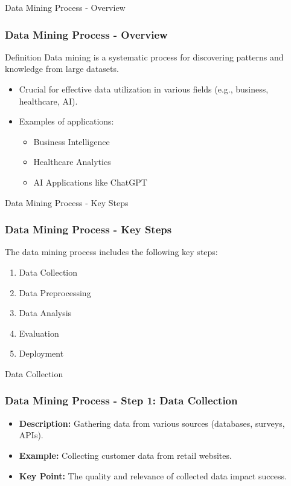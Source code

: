 \documentclass[aspectratio=169]{beamer}
\begin{document}
\begin{frame}[fragile]{Data Mining Process - Overview}
    \frametitle{Data Mining Process - Overview}
    \begin{block}{Definition}
        Data mining is a systematic process for discovering patterns and knowledge from large datasets. 
    \end{block}
    \begin{itemize}
        \item Crucial for effective data utilization in various fields (e.g., business, healthcare, AI).
        \item Examples of applications: 
        \begin{itemize}
            \item Business Intelligence
            \item Healthcare Analytics
            \item AI Applications like ChatGPT
        \end{itemize}
    \end{itemize}
\end{frame}

\begin{frame}[fragile]{Data Mining Process - Key Steps}
    \frametitle{Data Mining Process - Key Steps}
    The data mining process includes the following key steps:
    \begin{enumerate}
        \item Data Collection
        \item Data Preprocessing
        \item Data Analysis
        \item Evaluation
        \item Deployment
    \end{enumerate}
\end{frame}

\begin{frame}[fragile]{Data Collection}
    \frametitle{Data Mining Process - Step 1: Data Collection}
    \begin{itemize}
        \item \textbf{Description:} Gathering data from various sources (databases, surveys, APIs).
        \item \textbf{Example:} Collecting customer data from retail websites.
        \item \textbf{Key Point:} The quality and relevance of collected data impact success.
    \end{itemize}
\end{frame}
\end{document}
